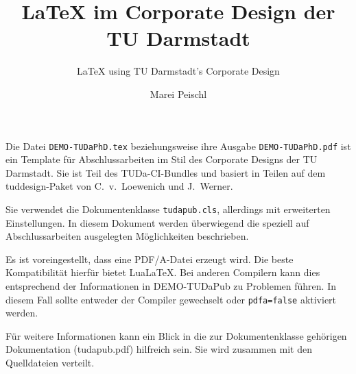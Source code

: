 \documentclass[
	ngerman,
	ruledheaders=chapter,%
	class=book,%
	thesis={
		type=dr,
		dr=rernat
	},
	accentcolor=9c,%
	custommargins=true,%
	marginpar=false,%
	parskip=half-,%
	fontsize=11pt,%
]{tudapub}
\let\file\texttt
\let\code\texttt
\begin{document}
	
	
	
\frontmatter
	
\title{\LaTeX{} im Corporate Design der TU Darmstadt}
\subtitle{\LaTeX{} using TU Darmstadt's Corporate Design}
\author[M. Peischl]{Marei Peischl}%
	
	

	
\submissiondate{\today}
\examdate{\today}
	
\dedication{For \TeX{} \& Friends}
	
\maketitle

\affidavit
	
Die Datei \file{DEMO-TUDaPhD.tex} beziehungsweise ihre Ausgabe \file{DEMO-TUDaPhD.pdf} ist ein Template für Abschlussarbeiten im Stil des Corporate Designs der TU Darmstadt.
Sie ist Teil des TUDa-CI-Bundles und basiert in Teilen auf dem tuddesign-Paket von C.~v.~Loewenich und J.~Werner. 

Sie verwendet die Dokumentenklasse \file{tudapub.cls}, allerdings mit erweiterten Einstellungen. In diesem Dokument werden überwiegend die speziell auf Abschlussarbeiten ausgelegten Möglichkeiten beschrieben.
	
Es ist voreingestellt, dass eine PDF/A-Datei erzeugt wird. Die beste Kompatibilität hierfür bietet Lua\LaTeX. Bei anderen Compilern kann dies entsprechend der Informationen in DEMO-TUDaPub zu Problemen führen. In diesem Fall sollte entweder der Compiler gewechselt oder \code{pdfa=false} aktiviert werden.
	
Für weitere Informationen kann ein Blick in die zur Dokumentenklasse gehörigen Dokumentation (tudapub.pdf) hilfreich sein. Sie wird zusammen mit den Quelldateien verteilt.
	
\end{document}
